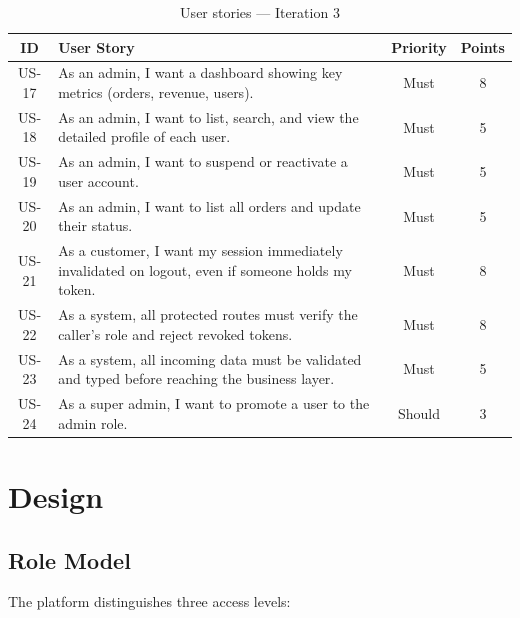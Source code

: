 \begin{table}[H]
\centering
\caption{User stories --- Iteration 3}
\begin{tabularx}{\textwidth}{|c|X|c|c|}
\hline
\rowcolor{gray!20}
\textbf{ID} & \textbf{User Story} & \textbf{Priority} & \textbf{Points} \\
\hline
US-17 & As an admin, I want a dashboard showing key metrics (orders, revenue, users). & Must & 8 \\
\hline
US-18 & As an admin, I want to list, search, and view the detailed profile of each user. & Must & 5 \\
\hline
US-19 & As an admin, I want to suspend or reactivate a user account. & Must & 5 \\
\hline
US-20 & As an admin, I want to list all orders and update their status. & Must & 5 \\
\hline
US-21 & As a customer, I want my session immediately invalidated on logout, even if someone holds my token. & Must & 8 \\
\hline
US-22 & As a system, all protected routes must verify the caller's role and reject revoked tokens. & Must & 8 \\
\hline
US-23 & As a system, all incoming data must be validated and typed before reaching the business layer. & Must & 5 \\
\hline
US-24 & As a super admin, I want to promote a user to the admin role. & Should & 3 \\
\hline
\end{tabularx}
\end{table}

\section{Design}

\subsection{Role Model}

The platform distinguishes three access levels:


